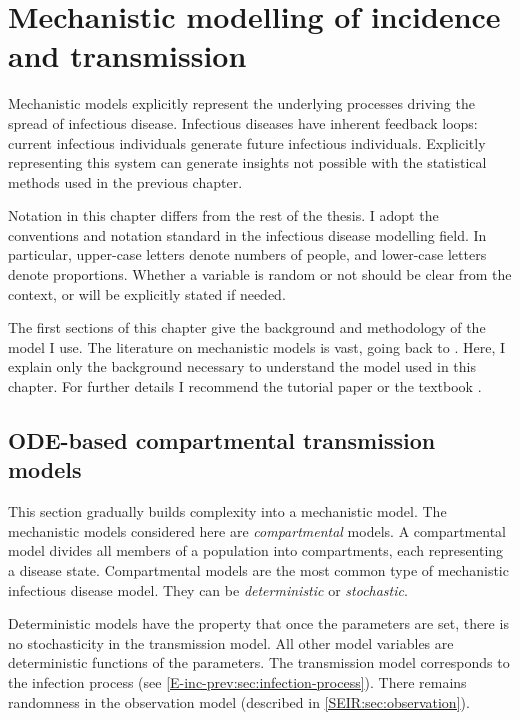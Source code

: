 \documentclass[thesis.tex]{subfiles}
\begin{document}
\chapter{Mechanistic modelling of incidence and transmission} \label{SEIR}

Mechanistic models explicitly represent the underlying processes driving the spread of infectious disease.
Infectious diseases have inherent feedback loops: current infectious individuals generate future infectious individuals.
Explicitly representing this system can generate insights not possible with the statistical methods used in the previous chapter.

Notation in this chapter differs from the rest of the thesis.
I adopt the conventions and notation standard in the infectious disease modelling field.
In particular, upper-case letters denote numbers of people, and lower-case letters denote proportions.
Whether a variable is random or not should be clear from the context, or will be explicitly stated if needed.

The first sections of this chapter give the background and methodology of the model I use.
The literature on mechanistic models is vast, going back to \textcite{kermackContribution}.
Here, I explain only the background necessary to understand the model used in this chapter.
For further details I recommend the tutorial paper \textcite{kretzschmarMathematical} or the textbook \textcite{keelingModeling}.

\section{ODE-based compartmental transmission models} \label{SEIR:sec:transmission}

This section gradually builds complexity into a mechanistic model.
The mechanistic models considered here are \emph{compartmental} models.
A compartmental model divides all members of a population into compartments, each representing a disease state.
Compartmental models are the most common type of mechanistic infectious disease model.
They can be \emph{deterministic} or \emph{stochastic}.

Deterministic models have the property that once the parameters are set, there is no stochasticity in the transmission model.
All other model variables are deterministic functions of the parameters.
The transmission model corresponds to the infection process (see \cref{E-inc-prev:sec:infection-process}).
There remains randomness in the observation model (described in \cref{SEIR:sec:observation}).
\end{document}
